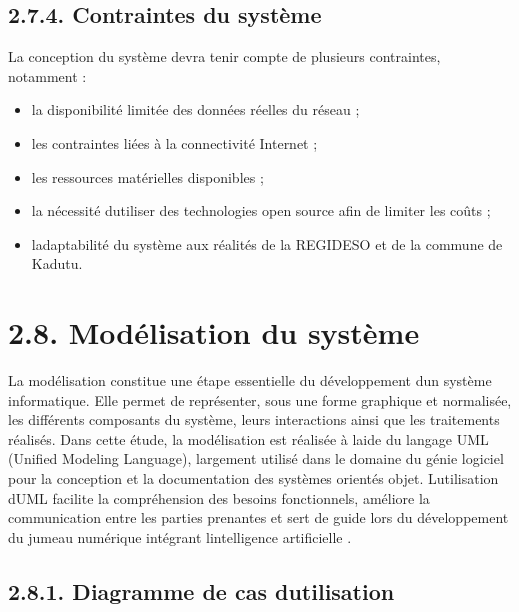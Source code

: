 \documentclass[12pt,a4paper,oneside]{report}
\begin{document}
\subsection{\texorpdfstring{\textbf{2.7.4. Contraintes du
système}}{2.7.4. Contraintes du système}}\label{contraintes-du-systuxe8me}

La conception du système devra tenir compte de plusieurs contraintes,
notamment :

\begin{itemize}
\item
  la disponibilité limitée des données réelles du réseau ;
\item
  les contraintes liées à la connectivité Internet ;
\item
  les ressources matérielles disponibles ;
\item
  la nécessité d\textquotesingle utiliser des technologies open source
  afin de limiter les coûts ;
\item
  l\textquotesingle adaptabilité du système aux réalités de la REGIDESO
  et de la commune de Kadutu.
\end{itemize}

\section{\texorpdfstring{\textbf{2.8. Modélisation du
système}}{2.8. Modélisation du système}}\label{moduxe9lisation-du-systuxe8me}

La modélisation constitue une étape essentielle du développement
d\textquotesingle un système informatique. Elle permet de représenter,
sous une forme graphique et normalisée, les différents composants du
système, leurs interactions ainsi que les traitements réalisés. Dans
cette étude, la modélisation est réalisée à l\textquotesingle aide du
langage UML (Unified Modeling Language), largement utilisé dans le
domaine du génie logiciel pour la conception et la documentation des
systèmes orientés objet. L\textquotesingle utilisation
d\textquotesingle UML facilite la compréhension des besoins
fonctionnels, améliore la communication entre les parties prenantes et
sert de guide lors du développement du jumeau numérique intégrant
l\textquotesingle intelligence artificielle \cite{ref123}.

\subsection{\texorpdfstring{\textbf{2.8.1. Diagramme de cas
d\textquotesingle utilisation}}{2.8.1. Diagramme de cas d\textquotesingle utilisation}}\label{diagramme-de-cas-dutilisation}
\end{document}
